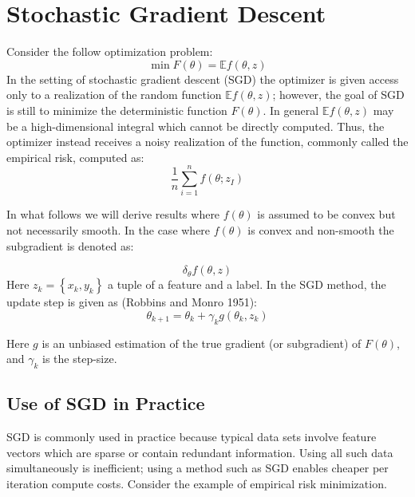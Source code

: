 \section{Stochastic Gradient Descent}
Consider the follow optimization problem:
\begin{equation}
	\min F(\theta) = \mathbb{E}f(\theta, z)
\end{equation}
In the setting of stochastic gradient descent (SGD) the optimizer is given access only to a realization of the random function $\mathbb{E} f (\theta, z)$; however, the goal of SGD is still to minimize the deterministic function $F(\theta)$. 
In general $\mathbb{E}f(\theta, z)$ may be a high-dimensional integral which cannot be directly computed. Thus, the optimizer instead receives a noisy realization of the function, commonly called the empirical risk, computed as:
\begin{equation}
	\frac{1}{n}\sum_{i=1}^{n} f(\theta; z_I)
\end{equation}

In what follows we will derive results where $f(\theta)$ is assumed to be convex but not necessarily smooth. In the case where $f(\theta)$ is convex and non-smooth the subgradient is denoted as: 

\begin{equation}
	\delta_{\theta} f (\theta,z)
\end{equation}
Here $z_k = \left\{x_k, y_k\right\}$ a tuple of a feature and a label. In the SGD method, the update step is given as (Robbins and Monro 1951): 
\begin{equation}
	\theta_{k+1} = \theta_k + \gamma_k g\left(\theta_k, z_k\right)
\end{equation}

Here $g$ is an unbiased estimation of the true gradient (or subgradient) of $F(\theta)$, and $\gamma_k$ is the step-size. 

\subsection{Use of SGD in Practice}
SGD is commonly used in practice because typical data sets involve feature vectors which are sparse or contain redundant information. Using all such data simultaneously is inefficient; using a method such as SGD enables cheaper per iteration compute costs. Consider the example of empirical risk minimization. 

